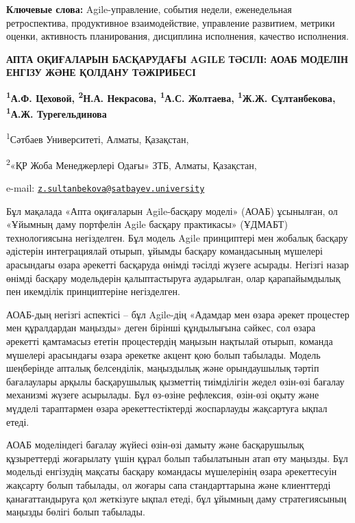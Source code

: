 {\bfseries Ключевые слова:} Agile-управление, события недели, еженедельная
ретроспектива, продуктивное взаимодействие, управление развитием,
метрики оценки, активность планирования, дисциплина исполнения, качество
исполнения.

\begin{articleheader}

{\bfseries АПТА ОҚИҒАЛАРЫН БАСҚАРУДАҒЫ AGILE ТӘСІЛІ: АОАБ МОДЕЛІН ЕНГІЗУ
ЖӘНЕ ҚОЛДАНУ ТӘЖІРИБЕСІ}

{\bfseries \textsuperscript{1}А.Ф. Цеховой, \textsuperscript{2}Н.А.
Некрасова, \textsuperscript{1}А.С. Жолтаева, \textsuperscript{1}Ж.Ж.
Сұлтанбекова\textsuperscript{\envelope }, \textsuperscript{1}А.Ж. Турегельдинова}
\end{articleheader}
\begin{affiliation}

\textsuperscript{1}Сәтбаев Университеті, Алматы, Қазақстан,

\textsuperscript{2}«ҚР Жоба Менеджерлері Одағы» ЗТБ, Алматы, Қазақстан,

e-mail:
\href{mailto:z.sultanbekova@satbayev.university}{\nolinkurl{z.sultanbekova@satbayev.university}}
\end{affiliation}

Бұл мақалада «Апта оқиғаларын Agile-басқару моделі» (АОАБ) ұсынылған, ол
«Ұйымның даму портфелін Agile басқару практикасы» (ҰДМАБТ)
технологиясына негізделген. Бұл модель Agile принциптері мен жобалық
басқару әдістерін интеграциялай отырып, ұйымды басқару командасының
мүшелері арасындағы өзара әрекетті басқаруда өнімді тәсілді жүзеге
асырады. Негізгі назар өнімді басқару модельдерін қалыптастыруға
аударылған, олар қарапайымдылық пен икемділік принциптеріне негізделген.

АОАБ-дың негізгі аспектісі -- бұл Agile-дің «Адамдар мен өзара әрекет
процестер мен құралдардан маңызды» деген бірінші құндылығына сәйкес, сол
өзара әрекетті қамтамасыз ететін процестердің маңызын нақтылай отырып,
команда мүшелері арасындағы өзара әрекетке акцент қою болып табылады.
Модель шеңберінде апталық белсенділік, маңыздылық және орындаушылық
тәртіп бағалаулары арқылы басқарушылық қызметтің тиімділігін жедел
өзін-өзі бағалау механизмі жүзеге асырылады. Бұл өз-өзіне рефлексия,
өзін-өзі оқыту және мүдделі тараптармен өзара әрекеттестіктерді
жоспарлауды жақсартуға ықпал етеді.

АОАБ моделіндегі бағалау жүйесі өзін-өзі дамыту және басқарушылық
құзыреттерді жоғарылату үшін құрал болып табылатынын атап өту маңызды.
Бұл модельді енгізудің мақсаты басқару командасы мүшелерінің өзара
әрекеттесуін жақсарту болып табылады, ол жоғары сапа стандарттарына және
клиенттерді қанағаттандыруға қол жеткізуге ықпал етеді, бұл ұйымның даму
стратегиясының маңызды бөлігі болып табылады.

